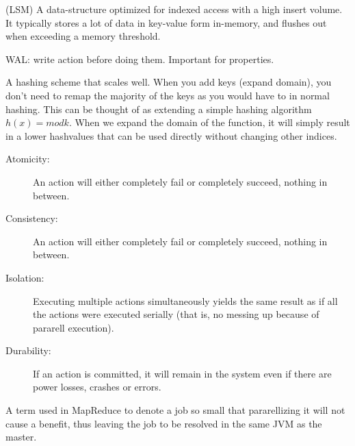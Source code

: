 \begin{definition}\label{def:LSM}
    (LSM) A data-structure optimized for indexed access with a high insert volume.
    It typically stores a lot of data in key-value form in-memory, and flushes out
    when exceeding a memory threshold.
\end{definition}

\begin{definition}\label{def:WAL}
    WAL: write action before doing them. Important for  properties.
\end{definition}

\begin{definition}\label{def:consistenthashing}
    A hashing scheme that scales well. When you add keys (expand domain), you don't need to
    remap the majority of the keys as you would have to in normal hashing.
    This can be thought of as extending a simple hashing algorithm $h(x) = mod k$.
    When we expand the domain of the function, it will simply result in a lower hashvalues that can
    be used directly without changing other indices.
\end{definition}

\begin{definition}[ACID]\label{def:acid}
    \begin{description}
        \item[Atomicity:] An action will either completely fail or completely succeed, nothing  in between.
        \item[Consistency:] An action will either completely fail or completely succeed, nothing  in between.
        \item[Isolation:] Executing multiple actions simultaneously yields the same result as if all the actions
            were executed serially (that is, no messing up because of pararell execution).
        \item[Durability:] If an action is committed, it will remain in the system even if there are
            power losses, crashes or errors.
    \end{description}
\end{definition}

\begin{definition}\label{def:ubertask}
    A term used in MapReduce to denote a job so small that pararellizing it
    will not cause a benefit, thus leaving the job to be resolved in the same JVM 
    as the master.
\end{definition}

